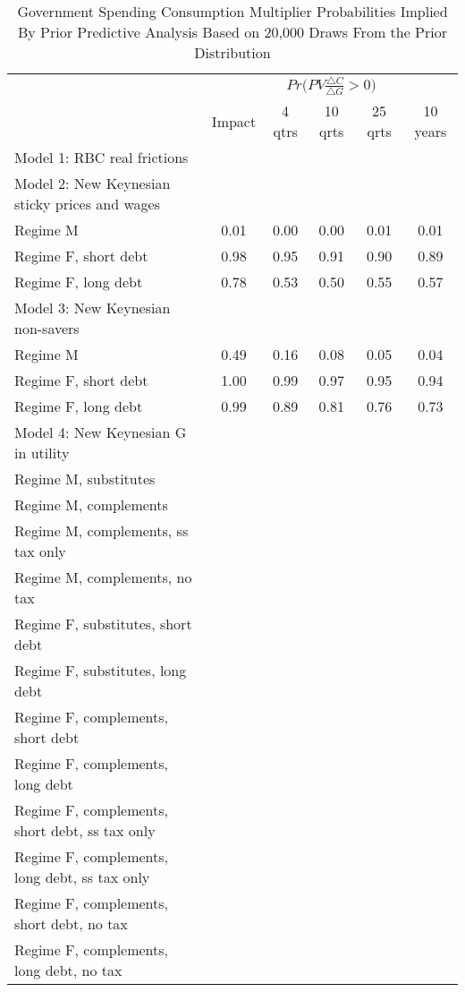 \documentclass[letterpaper,12pt]{article}%
\begin{document}
\begin{table}[H]
    \centering
     \caption{Government Spending Consumption Multiplier Probabilities Implied By Prior Predictive Analysis Based on 20,000 Draws From the Prior Distribution}
    \begin{tabular}{l c c c c c}
    \toprule
        & \multicolumn{5}{c}{$Pr\Big(PV \frac{\triangle C}{\triangle G}>0\Big)$}\\
        \cmidrule{2-6}
        & Impact & 4 qtrs & 10 qrts & 25 qrts & 10 years \\
        \midrule
     Model 1: RBC real frictions &    &   &   &   &  \\
     Model 2: New Keynesian sticky prices and wages    &    &   &   &   &  \\
     \quad Regime M &   0.01 &  0.00  & 0.00 & 0.01 & 0.01  \\
     \quad Regime F, short debt &  0.98 & 0.95 &  0.91  & 0.90  & 0.89  \\
     \quad Regime F, long debt &  0.78  &  0.53 & 0.50 & 0.55 & 0.57  \\
     Model 3: New Keynesian non-savers &    &   &   &   &  \\
     \quad Regime M &  0.49 &  0.16 & 0.08 & 0.05 & 0.04 \\
     \quad Regime F, short debt &  1.00 & 0.99  & 0.97 &  0.95 &  0.94 \\
     \quad Regime F, long debt &  0.99 &  0.89  & 0.81 & 0.76  & 0.73  \\
     Model 4: New Keynesian G in utility &    &   &   &   &  \\
     \quad Regime M, substitutes &    &   &   &   &  \\
     \quad Regime M, complements &    &   &   &   &  \\
     \quad Regime M, complements, ss tax only &    &   &   &   &  \\
     \quad Regime M, complements, no tax &    &   &   &   &  \\
     \quad Regime F, substitutes, short debt &    &   &   &   &  \\
     \quad Regime F, substitutes, long debt &    &   &   &   &  \\
     \quad Regime F, complements, short debt &    &   &   &   &  \\
     \quad Regime F, complements, long debt &    &   &   &   &  \\
     \quad Regime F, complements, short debt, ss tax only &    &   &   &   &  \\
     \quad Regime F, complements, long debt, ss tax only &    &   &   &   &  \\
     \quad Regime F, complements, short debt, no tax &    &   &   &   &  \\
     \quad Regime F, complements, long debt, no tax &    &   &   &   &  \\
    \bottomrule    
    \end{tabular}
    \label{tab:my_label}
\end{table}
\end{document}
